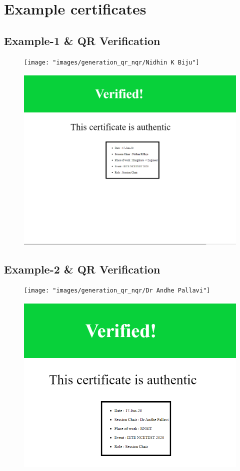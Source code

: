 \chapter{Example certificates}

\section{Example-1 \& QR Verification}

\begin{figure}[H]
	\centering
	\texttt{[image: "images/generation\_qr\_nqr/Nidhin K Biju"]}
	\label{fig:nidhin-k-biju}
\end{figure}
\begin{figure}[H]
	\centering
	\includegraphics[width=0.6\linewidth]{"images/generation_qr_nqr/Screenshot (64)"}
	\label{fig:screenshot-64}
\end{figure}


\section{Example-2 \& QR Verification}

\begin{figure}[H]
	\centering
	\texttt{[image: "images/generation\_qr\_nqr/Dr Andhe Pallavi"]}
	\label{fig:dr-andhe-pallavi}
\end{figure}
\begin{figure}[H]
	\centering
	\includegraphics[width=0.6\linewidth]{"images/generation_qr_nqr/Screenshot (63)"}
	\label{fig:screenshot-63}
\end{figure}
